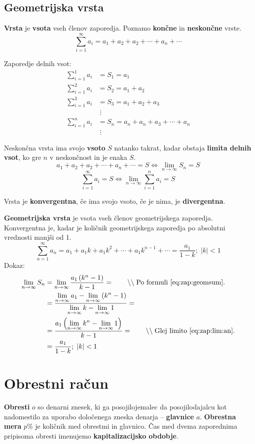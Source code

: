 \documentclass[a4paper,oneside,12pt,fleqn]{article}
\newcommand{\comment}[1]{\ensuremath{\qquad\backslash\backslash\;}\textnormal{#1}}
\def\limi{\displaystyle\lim_{n\to\infty}} %
\def\sumi{\displaystyle\sum^{\infty}} %
\renewcommand\iff\Leftrightarrow
\numberwithin{equation}{section}
\begin{document}
\subsection{Geometrijska vrsta}
\label{sec:zap:geovrst}
\textbf{Vrsta} je \textbf{vsota} vseh členov zaporedja. Poznamo \textbf{končne} in
\textbf{neskončne} vrste. 
\[ \sumi_{i=1} a_i = a_1 + a_2 + a_2 + \cdots + a_n + \cdots \]

Zaporedje delnih vsot:
\begin{align*}
  \sum^1_{i=1} a_i &= S_1 = a_1 \\
  \sum^2_{i=1} a_i &= S_2 = a_1 + a_2 \\
  \sum^3_{i=1} a_i &= S_3 = a_1 + a_2 + a_3 \\[-10pt]
  & \; \vdots \\[-10pt]
  \sum^n_{i=1} a_i &= S_n = a_n + a_n + a_3 + \cdots + a_n \\[-10pt]
  & \; \vdots
\end{align*}

Neskončna vrsta ima svojo \textbf{vsoto} $S$ natanko takrat, kadar obstaja \textbf{limita
delnih vsot}, ko gre
$n$ v neskončnost in je enaka $S$.
\[ a_1 + a_2 + a_2 + \cdots + a_n + \cdots = S \iff \limi S_n = S \]
\[ \sumi_{i=1} a_i = S \iff \limi{ \sum^n_{i=1}a_i} = S \]

Vrsta je \textbf{konvergentna}, če ima svojo vsoto, če je nima, je \textbf{divergentna}.

\textbf{Geometrijska vrsta} je vsota vseh členov geometrijskega zaporedja. Konvergentna
je, kadar je količnik geometrijskega zaporedja po absolutni vrednosti manjši od 1. 
\[ \sumi_{n=1}a_n = a_1 + a_1k + a_1k^2 + \cdots + a_1k^{n-1} + \cdots = \frac{a_1}{1-k};
\;  \left|k\right| < 1 \]
Dokaz:
\begin{align*}
   \limi S_n &= \limi \frac{a_1 \left( k^n - 1 \right)}{k-1} = \comment{Po formuli
  \eqref{eq:zap:geomsum}.} \\
  & = \frac{\limi a_1 - \limi \left( k^n-1 \right)}{\limi k - \limi1} = \\
  & = \frac{a_1 \left(\limi k^n - \limi 1 \right)}{k-1} = \comment{Glej limito~\eqref{eq:zap:lim:an}.} \\
  & = \frac{a_1}{1-k}; \; \left|k\right|<1
\end{align*}

\section{Obrestni račun}
\label{sec:obrest}
\textbf{Obresti} $o$ so denarni znesek, ki ga posojilojemalec da posojilodajalcu kot nadomestilo za
uporabo določenega zneska denarja -- \textbf{glavnice} $a$. \textbf{Obrestna mera} $p\%$ je količnik
med obrestmi in glavnico. Čas med dvema zaporednima pripisoma obresti imenujemo
\textbf{kapitalizacijsko obdobje}.
\end{document}
